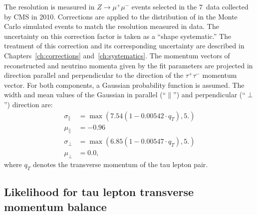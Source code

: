 The \MET resolution is measured in $Z \to \mu^{+} \mu^{-}$ events selected in
the $7$~\TeV data collected by CMS in 2010.  Corrections are applied to the
distribution of \MET in the Monte Carlo simulated events to match the resolution
measured in data.  The uncertainty on this correction factor is taken as a
``shape systematic.''  The treatment of this correction and its corresponding
uncertainty are described in Chapters~\ref{ch:corrections}
and~\ref{ch:systematics}.  The momentum vectors of reconstructed \MET and
neutrino momenta given by the fit parameters are projected in direction parallel
and perpendicular to the direction of the $\tau^{+} \tau^{-}$ momentum vector.
For both components, a Gaussian probability function is assumed.  The width and
mean values of the Gaussian in parallel (``$\parallel$'') and perpendicular
(``$\perp$'') direction are:
\begin{align}
\sigma_\parallel &= \max \left( 7.54 \left( 1 - 0.00542 \cdot q_{T} \right), 5. \right) \nonumber\\
\mu_\parallel &= -0.96 \nonumber \\
\sigma_\perp &= \max \left( 6.85 \left( 1 - 0.00547 \cdot q_{T} \right), 5. \right) \nonumber \\
\mu_\perp &= 0.0, \nonumber
\end{align}
where $q_{T}$ denotes the transverse momentum of the tau lepton pair.


\subsection{Likelihood for tau lepton transverse momentum balance}
\label{sec:ptBalance}

